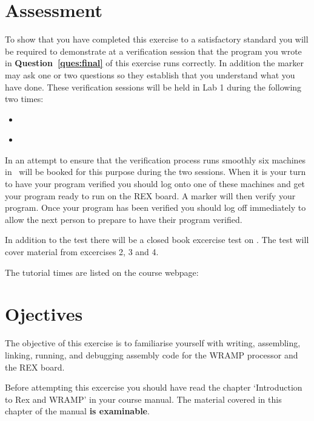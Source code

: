 \documentclass[a4paper,10pt]{article}
\begin{document}


\section{Assessment}
To show that you have completed this exercise to a satisfactory
standard you will be required to demonstrate at a verification session
that the program you wrote in \textbf{Question~\ref{ques:final}} 
of this exercise
runs correctly. In addition the marker may ask one or two questions so
they establish that you understand what you have done.  These
verification sessions will be held in Lab 1 during the following two
times:

\begin{itemize}
\item \INTRODUE~\MORNINGASSESS
\item \INTRODUE~\AFTERNOONASSESS 
\end{itemize}

In an attempt to ensure that the verification process runs smoothly
six machines in \ASSESSROOM\ will be booked for this purpose during the two
sessions. When it is your turn to have your program verified you
should log onto one of these machines and get your program ready to
run on the REX board. A marker will then verify your program. Once
your program has been verified you should log off immediately to allow
the next person to prepare to have their program verified.

In addition to the test there will be a closed book excercise test on
\textbf{\CWRAMPTEST}.  The test will cover material 
from excercises 2, 3 and 4.

The tutorial times are listed on the course webpage:

\begin{center}
\src{\WEBPAGEBASE}
\end{center}

\section{Ojectives}
The objective of this exercise is to familiarise 
yourself with writing, assembling, linking, running, and
debugging assembly code for the WRAMP processor and the REX board.

Before attempting this excercise you should have read the 
chapter `Introduction to Rex and WRAMP' in your course manual.  The material covered in this chapter of the manual \textbf{is examinable}.
\end{document}
